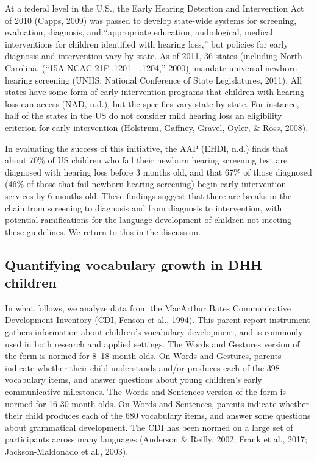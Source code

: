 \documentclass[
  english,
  man]{apa6}
\begin{document}
At a federal level in the U.S., the Early Hearing Detection and Intervention Act of 2010 (Capps, 2009) was passed to develop state-wide systems for screening, evaluation, diagnosis, and \enquote{appropriate education, audiological, medical interventions for children identified with hearing loss,} but policies for early diagnosis and intervention vary by state. As of 2011, 36 states (including North Carolina, (``15A NCAC 21F .1201 - .1204,'' 2000){]} mandate universal newborn hearing screening (UNHS; National Conference of State Legislatures, 2011). All states have some form of early intervention programs that children with hearing loss can access (NAD, n.d.), but the specifics vary state-by-state. For instance, half of the states in the US do not consider mild hearing loss an eligibility criterion for early intervention (Holstrum, Gaffney, Gravel, Oyler, \& Ross, 2008).

In evaluating the success of this initiative, the AAP (EHDI, n.d.) finds that about 70\% of US children who fail their newborn hearing screening test are diagnosed with hearing loss before 3 months old, and that 67\% of those diagnosed (46\% of those that fail newborn hearing screening) begin early intervention services by 6 months old. These findings suggest that there are breaks in the chain from screening to diagnosis and from diagnosis to intervention, with potential ramifications for the language development of children not meeting these guidelines. We return to this in the discussion.

\hypertarget{quantifying-vocabulary-growth-in-dhh-children}{%
\subsection{Quantifying vocabulary growth in DHH children}\label{quantifying-vocabulary-growth-in-dhh-children}}

In what follows, we analyze data from the MacArthur Bates Communicative Development Inventory (CDI, Fenson et al., 1994). This parent-report instrument gathers information about children's vocabulary development, and is commonly used in both research and applied settings. The Words and Gestures version of the form is normed for 8--18-month-olds. On Words and Gestures, parents indicate whether their child understands and/or produces each of the 398 vocabulary items, and answer questions about young children's early communicative milestones. The Words and Sentences version of the form is normed for 16-30-month-olds. On Words and Sentences, parents indicate whether their child produces each of the 680 vocabulary items, and answer some questions about grammatical development. The CDI has been normed on a large set of participants across many languages (Anderson \& Reilly, 2002; Frank et al., 2017; Jackson-Maldonado et al., 2003).
\end{document}
